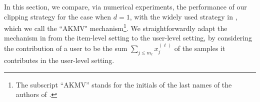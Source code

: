 \label{sec:experiments}
In this section, we compare, via numerical experiments, the performance of our clipping strategy for the case when $d=1$, with the widely used strategy in \cite[Sec. 3]{amin}, which we call the ``AKMV" mechanism\footnote{The subscript ``AKMV'' stands for the initials of the last names of the authors of \cite{amin}.}. We straightforwardly adapt the mechanism in \cite{amin} from the item-level setting to the user-level setting, by considering the contribution of a user to be the sum $\sum_{j\leq m_\ell} x_j^{(\ell)}$ of the samples it contributes in the user-level setting. 


